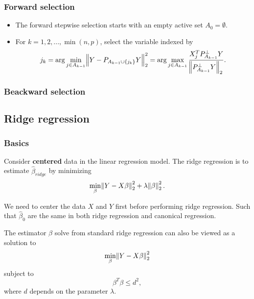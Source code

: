 \begin{refsection}
\begin{lemma}
	
\end{lemma}

\subsubsection{Forward selection}



\begin{method}
\begin{itemize}
	\item The forward stepwise selection starts with an empty active set $A_0 = \emptyset$.
	\item  For $k=1,2,...,\min(n,p)$, select the variable indexed by
	$$j_k = \arg\min_{j\in A_{k-1}} \norm{Y- P_{A_{k-1}\cup \{j_k\}}Y}_2^2 = \arg\max_{j\in A_{k-1}}\frac{X_j^TP^{\perp}_{A_{k-1}}Y}{\norm{P^{\perp}_{A_{k-1}}Y}_2}.$$
\end{itemize}	
	
\end{method}

\subsubsection{Beackward selection}


\subsection{Ridge regression}
\subsubsection{Basics}
\begin{definition}
	Consider \textbf{centered} data in the linear regression model. The ridge regression is to estimate $\hat{\beta}_{ridge}$ by minimizing
	$$\min_{\beta} \norm{Y - X\beta}_2^2 + \lambda \norm{\beta}_2^2.$$
\end{definition}

\begin{remark}
	We need to center the data $X$ and $Y$ first before performing ridge regression. Such that $\hat{\beta}_0$ are the same in both ridge regression and canonical regression.
\end{remark}

\begin{remark}\cite[352]{montgomery2012introduction}
	The estimator $\beta$ solve from standard ridge regression can also be viewed as a solution to
	$$\min_{\beta} \norm{Y - X\beta}_2^2  $$
	subject to $$\beta^T\beta \leq d^2,$$
	where $d$ depends on the parameter $\lambda$.	
\end{remark}




\end{refsection}
